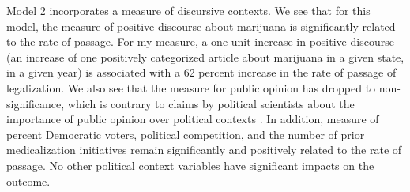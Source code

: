 
%

%



%


%


%







Model 2 incorporates a measure of discursive contexts. We see that for this model, the measure of positive discourse about marijuana is significantly related to the rate of passage. 
For my measure, a one-unit increase in positive discourse (an increase of one positively categorized article about marijuana in a given state, in a given year) is associated with a 62 percent increase in the rate of passage of legalization. We also see that the measure for public opinion has dropped to non-significance, which is contrary to claims by political scientists about the importance of public opinion over political contexts \citep{burstein_and_linton_2002}. In addition, measure of percent Democratic voters, political competition, and the number of prior medicalization initiatives remain significantly and positively related to the rate of passage. No other political context variables have significant impacts on the outcome.

